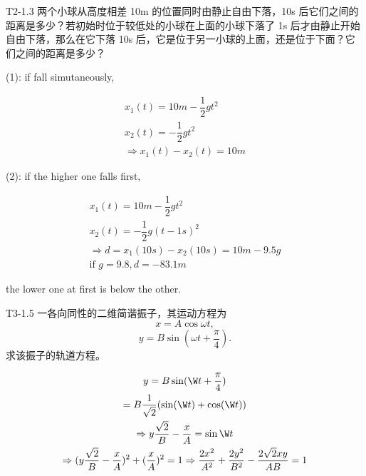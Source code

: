 \documentclass[UTF8]{ctexart} %
\begin{document}
\begin{question}{T2-1.3}
两个小球从高度相差 10m 的位置同时由静止自由下落，10s 后它们之间的距离是多少？若初始时位于较低处的小球在上面的小球下落了 1s 后才由静止开始自由下落，那么在它下落 10s 后，它是位于另一小球的上面，还是位于下面？它们之间的距离是多少？
\end{question}
\begin{solve}

(1):
if fall simutaneously, 

\[
\begin{gathered}
x_1(t)=10m-\dfrac{1}{2} gt^2 \\
x_2(t)=-\dfrac{1}{2} gt^2 \\
\Rightarrow x_1(t)-x_2(t)=10m
\end{gathered}
\]

(2):
if the higher one falls first,

\[
\begin{gathered}
x_1(t)=10m-\dfrac{1}{2} gt^2 \\
x_2(t)=-\dfrac{1}{2} g(t-1s)^2 \\
\Rightarrow d=x_1(10s)-x_2(10s)=10m-9.5g \\
\text{if } g=9.8,d=-83.1m
\end{gathered}
\]

the lower one at first is below the other.

\end{solve}

\begin{question}{T3-1.5}
一各向同性的二维简谐振子，其运动方程为
\[x = A \cos \omega t,\]
\[y = B \sin \left( \omega t + \frac{\pi}{4} \right).\]
求该振子的轨道方程。
\end{question}

\begin{solve}

\[
\begin{gathered}
y=B\sin(\W t+\dfrac{\pi }{4} ) \\
=B\dfrac{1}{\sqrt 2} (\sin(\W t)+\cos(\W t)) \\
\Rightarrow y\dfrac{\sqrt 2}{B}-\dfrac{x}{A} =\sin \W t \\
\Rightarrow (y\dfrac{\sqrt 2}{B}-\dfrac{x}{A})^2+(\dfrac{x}{A} )^2=1
\Rightarrow \dfrac{2x^2}{A^2} +\dfrac{2y^2}{B^2} -\dfrac{2\sqrt 2xy}{AB} =1
\end{gathered}
\]

\end{solve}
\end{document}
